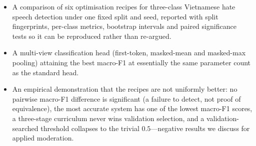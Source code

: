 \begin{itemize}
  \item A comparison of six optimisation recipes for three-class Vietnamese hate
        speech detection under one fixed split and seed, reported with split
        fingerprints, per-class metrics, bootstrap intervals and paired significance
        tests so it can be reproduced rather than re-argued.
  \item A multi-view classification head (first-token, masked-mean and masked-max
        pooling) attaining the best macro-F1 at essentially the same parameter
        count as the standard head.
  \item An empirical demonstration that the recipes are not uniformly better: no
        pairwise macro-F1 difference is significant (a failure to detect, not
        proof of equivalence), the most accurate system has one of the lowest
        macro-F1 scores, a three-stage curriculum never wins validation
        selection, and a validation-searched threshold collapses to the trivial
        $0.5$---negative results we discuss for applied moderation.
\end{itemize}
